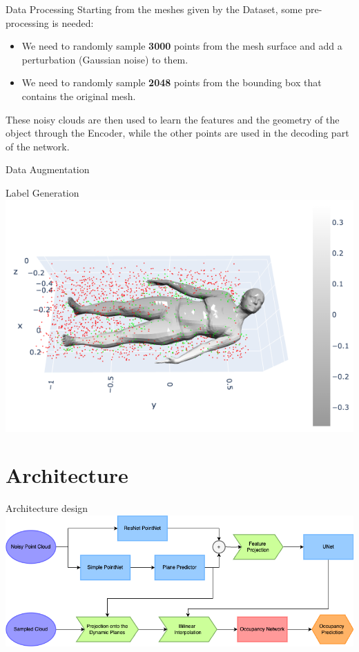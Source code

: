 \documentclass{beamer}
\begin{document}
\begin{frame}{Data Processing}
    Starting from the meshes given by the Dataset, some pre-processing is needed:
    \begin{itemize}
        \item We need to randomly sample \textbf{3000} points from the mesh surface and add a perturbation (Gaussian noise) to them.
        \item We need to randomly sample \textbf{2048} points from the bounding box that contains the original mesh.
    \end{itemize}
    These noisy clouds are then used to learn the features and the geometry of the object through the Encoder, while the other points are used in the decoding part of the network.
\end{frame}

\begin{frame}{Data Augmentation}

\end{frame}
\begin{frame}{Label Generation}
  \includegraphics[width=\textwidth]{../media/label_occupancy.png}
\end{frame}

\section{Architecture}

\begin{frame}{Architecture design}
\includegraphics[width=\textwidth]{../media/pipeline_chiaro.png}
\end{frame}
\end{document}
